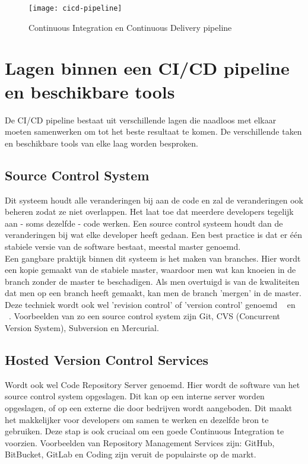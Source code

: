     \begin{figure}	
        \texttt{[image: cicd-pipeline]}
        \caption{Continuous Integration en Continuous Delivery pipeline ~\autocite{Tuli2018}} \label{cicd-pipeline}
    \end{figure}
    
    \section{Lagen binnen een CI/CD pipeline en beschikbare tools}
    De CI/CD pipeline bestaat uit verschillende lagen die naadloos met elkaar moeten samenwerken om tot het beste resultaat te komen. De verschillende taken en beschikbare tools van elke laag worden besproken.
    
        \subsection{Source Control System}
        \label{subsec:source-control-systeem}
        Dit systeem houdt alle veranderingen bij aan de code en zal de veranderingen ook beheren zodat ze niet overlappen. Het laat toe dat meerdere developers tegelijk aan - soms dezelfde - code werken. Een source control systeem houdt dan de veranderingen bij wat elke developer heeft gedaan. Een best practice is dat er één stabiele versie van de software bestaat, meestal master genoemd.\\
        Een gangbare praktijk binnen dit systeem is het maken van branches. Hier wordt een kopie gemaakt van de stabiele master, waardoor men wat kan knoeien in de branch zonder de master te beschadigen. Als men overtuigd is van de kwaliteiten dat men op een branch heeft gemaakt, kan men de branch 'mergen' in de master. Deze techniek wordt ook wel 'revision control' of 'version control' genoemd ~\autocite{Skelton2014} en ~\autocite{Riti2018}.
        Voorbeelden van zo een source control system zijn Git, CVS (Concurrent Version System), Subversion en Mercurial.
        
        \subsection{Hosted Version Control Services}
        Wordt ook wel Code Repository Server genoemd. Hier wordt de software van het source control system opgeslagen. Dit kan op een interne server worden opgeslagen, of op een externe die door bedrijven wordt aangeboden. Dit maakt het makkelijker voor developers om samen te werken en dezelfde bron te gebruiken. Deze stap is ook cruciaal om een goede Continuous Integration te voorzien.
        Voorbeelden van Repository Management Services zijn: GitHub, BitBucket, GitLab en Coding zijn veruit de populairste op de markt.
        
